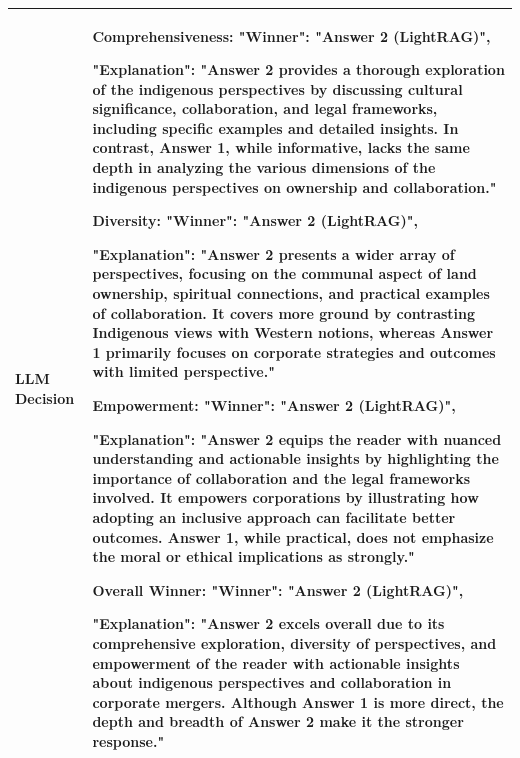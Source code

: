 \begin{table}[t]
{\begin{tabular}{|l|p{15cm}|}
 \\ \hline
\textbf{LLM Decision} & \textbf{Comprehensiveness}:  
"Winner": "Answer 2 (LightRAG)", %

"Explanation": "Answer 2 provides a thorough exploration of the indigenous perspectives by discussing cultural significance, collaboration, and legal frameworks, including specific examples and detailed insights. In contrast, Answer 1, while informative, lacks the same depth in analyzing the various dimensions of the indigenous perspectives on ownership and collaboration." \newline

\textbf{Diversity}:  
"Winner": "Answer 2 (LightRAG)", %

"Explanation": "Answer 2 presents a wider array of perspectives, focusing on the communal aspect of land ownership, spiritual connections, and practical examples of collaboration. It covers more ground by contrasting Indigenous views with Western notions, whereas Answer 1 primarily focuses on corporate strategies and outcomes with limited perspective." \newline

\textbf{Empowerment}:  
"Winner": "Answer 2 (LightRAG)", %

"Explanation": "Answer 2 equips the reader with nuanced understanding and actionable insights by highlighting the importance of collaboration and the legal frameworks involved. It empowers corporations by illustrating how adopting an inclusive approach can facilitate better outcomes. Answer 1, while practical, does not emphasize the moral or ethical implications as strongly." \newline

\textbf{Overall Winner}:  
"Winner": "Answer 2 (LightRAG)",  %

"Explanation": "Answer 2 excels overall due to its comprehensive exploration, diversity of perspectives, and empowerment of the reader with actionable insights about indigenous perspectives and collaboration in corporate mergers. Although Answer 1 is more direct, the depth and breadth of Answer 2 make it the stronger response." \\ \hline

\end{tabular}
}
\end{table}

